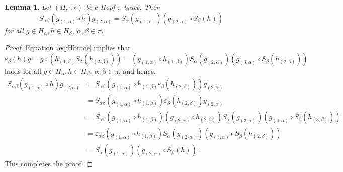 \documentclass[11pt]{article}
\def\a{\alpha}
\def\b{\beta}
\def\v{\varepsilon}
\newtheorem{lemma}[theorem]{Lemma}
\begin{document}
\begin{lemma}	\label{lem:truco}
Let $(H,\cdot,\circ)$ be a Hopf $\pi$-brace. Then
\begin{equation}\label{eq:Hbrace2}
  S_{\a\b}(g_{(1,\a)}\circ h)g_{(2,\a)} = S_{\a}(g_{(1,\a)})(g_{(2,\a)}\circ S_{\b}(h))
\end{equation}
for all $g\in H_\a, h\in H_\b,~ \a,\b\in\pi$. 
\end{lemma}

\begin{proof}
Equation~\eqref{eq:Hbrace} implies that
\begin{equation*}	%
\v_\b(h)g = g\circ (h_{(1,\b)}S_{\b}(h_{(2,\b)})) = (g_{(1,\a)}\circ h_{(1,\b)})S_{\a}(g_{(2,\a)})(g_{(3,\a)}\circ S_{\b}(h_{(2,\b)}))
\end{equation*}
holds for all $g\in H_\a, h\in H_\b,~ \a,\b\in\pi$, and hence,
\begin{align*}
S_{\a\b}(g_{(1,\a)}\circ h)g_{(2,\a)} &= S_{\a\b}(g_{(1,\a)}\circ h_{(1,\b)}\v_\b(h_{(2,\b)}))g_{(2,\a)} \\
&= S_{\a\b}(g_{(1,\a)}\circ h_{(1,\b)})\v_\b(h_{(2,\b)})g_{(2,\a)}\\
&=S_{\a\b}(g_{(1,\a)}\circ h_{(1,\b)})(g_{(2,\a)}\circ h_{(2,\b)})S_\a(g_{(3,\a)})(g_{(4,\a)}\circ S_\b(h_{(3,\b)}))\\
&=\v_{\a\b}(g_{(1,\a)}\circ h_{(1,\b)})S_\a(g_{(2,\a)})(g_{(3,\a)}\circ S_\b(h_{(2,\b)}))\\
&=S_\a(g_{(1,\a)})(g_{(2,\a)}\circ S_\b(h)).
\end{align*}
This completes the proof.
\end{proof}
\end{document}

